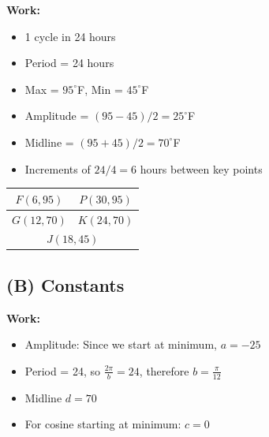 \documentclass[11pt]{article}
\begin{document}
\textbf{Work:}
\begin{itemize}[noitemsep]
    \item 1 cycle in 24 hours
    \item Period = 24 hours
    \item Max = $95^\circ$F, Min = $45^\circ$F
    \item Amplitude = $(95 - 45)/2 = 25^\circ$F
    \item Midline = $(95 + 45)/2 = 70^\circ$F
    \item Increments of $24/4 = 6$ hours between key points
\end{itemize}

\begin{center}
\end{center}

\begin{center}
\begin{tabular}{|c|c|}
\hline
$F(6, 95)$ & $P(30, 95)$ \\
\hline
$G(12, 70)$ & $K(24, 70)$ \\
\hline
\multicolumn{2}{|c|}{$J(18, 45)$} \\
\hline
\end{tabular}
\end{center}

\subsection*{(B) Constants}

\textbf{Work:}
\begin{itemize}[noitemsep]
    \item Amplitude: Since we start at minimum, $a = -25$
    \item Period = 24, so $\displaystyle\frac{2\pi}{b} = 24$, therefore $\displaystyle b = \frac{\pi}{12}$
    \item Midline $d = 70$
    \item For cosine starting at minimum: $c = 0$
\end{itemize}
\end{document}
